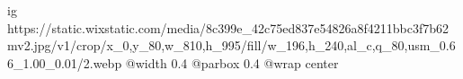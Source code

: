  
 
 
 
 

\ifcmt
  ig https://static.wixstatic.com/media/8c399e_42c75ed837e54826a8f4211bbc3f7b62~mv2.jpg/v1/crop/x_0,y_80,w_810,h_995/fill/w_196,h_240,al_c,q_80,usm_0.66_1.00_0.01/2.webp
  @width 0.4
  @parbox 0.4
  @wrap center
\fi
